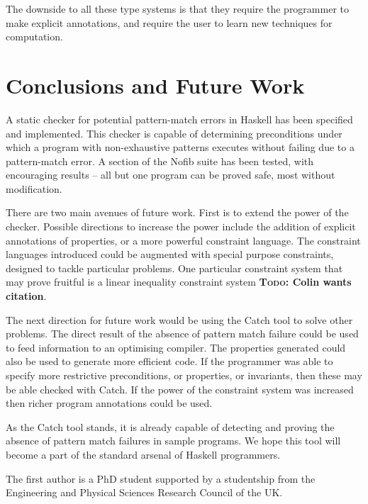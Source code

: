 \documentclass[preprint]{sigplanconf}
\newcommand{\todo}[1]{\textbf{\textsc{Todo:} #1}}
\begin{document}
The downside to all these type systems is that they require the programmer to make explicit annotations, and require the user to learn new techniques for computation.


\section{Conclusions and Future Work}
\label{sec:conclusion}

A static checker for potential pattern-match errors in Haskell has been specified and implemented. This checker is capable of determining preconditions under which a program with non-exhaustive patterns executes without failing due to a pattern-match error. A section of the Nofib suite has been tested, with encouraging results -- all but one program can be proved safe, most without modification.

There are two main avenues of future work. First is to extend the power of the checker. Possible directions to increase the power include the addition of explicit annotations of properties, or a more powerful constraint language. The constraint languages introduced could be augmented with special purpose constraints, designed to tackle particular problems. One particular constraint system that may prove fruitful is a linear inequality constraint system \todo{Colin wants citation}.

The next direction for future work would be using the Catch tool to solve other problems. The direct result of the absence of pattern match failure could be used to feed information to an optimising compiler. The properties generated could also be used to generate more efficient code. If the programmer was able to specify more restrictive preconditions, or properties, or invariants, then these may be able checked with Catch. If the power of the constraint system was increased then richer program annotations could be used.

As the Catch tool stands, it is already capable of detecting and proving the absence of pattern match failures in sample programs. We hope this tool will become a part of the standard arsenal of Haskell programmers.


%

\acks

The first author is a PhD student supported by a studentship from the Engineering and Physical Sciences Research Council of the UK.



\end{document}
